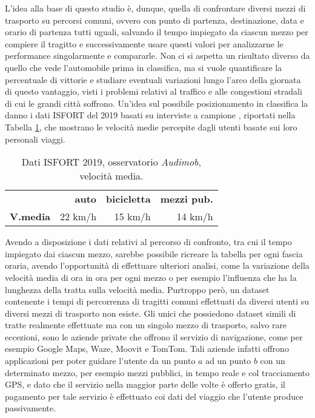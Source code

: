 L'idea alla base di questo studio è, dunque, quella di confrontare diversi mezzi di trasporto su percorsi comuni, ovvero con punto di partenza, destinazione, data e orario di partenza tutti uguali, salvando il tempo impiegato da ciascun mezzo per compiere il tragitto e successivamente usare questi valori per analizzarne le performance singolarmente e compararle. Non ci si aspetta un risultato diverso da quello che vede l'automobile prima in classifica, ma si vuole quantificare la percentuale di vittorie e studiare eventuali variazioni lungo l'arco della giornata di questo vantaggio, visti i problemi relativi al traffico e alle congestioni stradali di cui le grandi città soffrono. Un'idea sul possibile posizionamento in classifica la danno i dati ISFORT del 2019 basati su interviste a campione \cite{isfortaudimob}, riportati nella Tabella \ref{table:9}, che mostrano le velocità medie percepite dagli utenti basate sui loro personali viaggi.

\begin{table}[H]
	\centering
	\begin{tabular}{ | l  r  r r | }
		\hline
		& \textbf{auto} & \textbf{bicicletta} & \textbf{mezzi pub.} \\
		\textbf{V.media} & 22 km/h & 15 km/h & 14 km/h \\
		\hline
	\end{tabular}
	\caption{Dati ISFORT 2019, osservatorio \textit{Audimob}, velocità media.}
	\label{table:9}
\end{table}

Avendo a disposizione i dati relativi al percorso di confronto, tra cui il tempo impiegato dai ciascun mezzo, sarebbe possibile ricreare la tabella per ogni fascia oraria, avendo l'opportunità di effettuare ulteriori analisi, come la variazione della velocità media di ora in ora per ogni mezzo o per esempio l'influenza che ha la lunghezza della tratta sulla velocità media. Purtroppo però, un dataset contenente i tempi di percorrenza di tragitti comuni effettuati da diversi utenti su diversi mezzi di trasporto non esiste. Gli unici che possiedono dataset simili di tratte realmente effettuate ma con un singolo mezzo di trasporto, salvo rare eccezioni, sono le aziende private che offrono il servizio di navigazione, come per esempio Google Maps, Waze, Moovit e TomTom. Tali aziende infatti offrono applicazioni per poter guidare l'utente da un punto $a$ ad un punto $b$ con un determinato mezzo, per esempio mezzi pubblici, in tempo reale e col tracciamento GPS, e dato che il servizio nella maggior parte delle volte è offerto gratis, il pagamento per tale servizio è effettuato coi dati del viaggio che l'utente produce passivamente.

